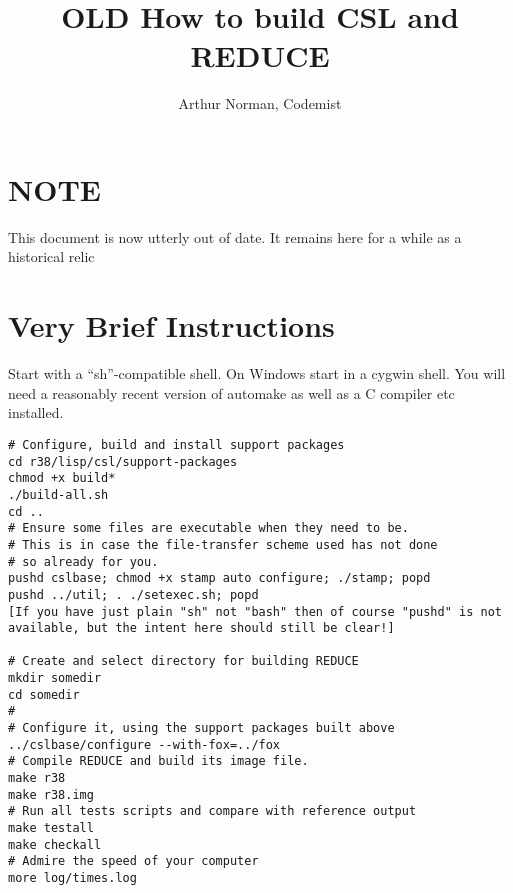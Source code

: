 \documentclass[11pt]{article}
\begin{document}
\title{{\bf OLD} How to build CSL and REDUCE}
\author{Arthur Norman, Codemist}
\maketitle
\section{NOTE}
{\HUGE This document is now utterly out of date. It remains here for
a while as a historical relic}

\section{Very Brief Instructions}
Start with a ``sh''-compatible shell. On Windows start in a
cygwin shell. You will need a reasonably recent version of
automake as well as a C compiler etc installed.
\begin{verbatim}
# Configure, build and install support packages
cd r38/lisp/csl/support-packages
chmod +x build*
./build-all.sh
cd ..
# Ensure some files are executable when they need to be.
# This is in case the file-transfer scheme used has not done
# so already for you.
pushd cslbase; chmod +x stamp auto configure; ./stamp; popd
pushd ../util; . ./setexec.sh; popd
[If you have just plain "sh" not "bash" then of course "pushd" is not
available, but the intent here should still be clear!]

# Create and select directory for building REDUCE
mkdir somedir
cd somedir
#
# Configure it, using the support packages built above
../cslbase/configure --with-fox=../fox
# Compile REDUCE and build its image file.
make r38
make r38.img
# Run all tests scripts and compare with reference output
make testall
make checkall
# Admire the speed of your computer
more log/times.log
\end{verbatim}
\end{document}
